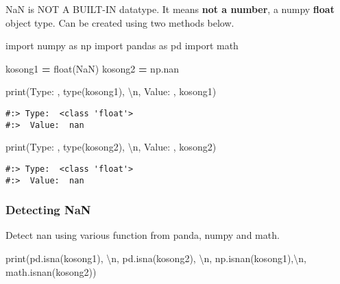 \documentclass[
]{book}
\newenvironment{Shaded}{\begin{snugshade}}{\end{snugshade}}
\newcommand{\BuiltInTok}[1]{#1}
\newcommand{\CharTok}[1]{\textcolor[rgb]{0.5,0.5,0.5}{#1}}
\newcommand{\ImportTok}[1]{#1}
\newcommand{\NormalTok}[1]{#1}
\newcommand{\OperatorTok}[1]{\textcolor[rgb]{0.43,0.43,0.43}{\textbf{#1}}}
\newcommand{\StringTok}[1]{\textcolor[rgb]{0.5,0.5,0.5}{#1}}
\begin{document}
NaN is NOT A BUILT-IN datatype. It means \textbf{not a number}, a numpy \textbf{float} object type. Can be created using two methods below.

\begin{Shaded}
\begin{Highlighting}[]
\ImportTok{import}\NormalTok{ numpy }\ImportTok{as}\NormalTok{ np}
\ImportTok{import}\NormalTok{ pandas }\ImportTok{as}\NormalTok{ pd}
\ImportTok{import}\NormalTok{ math}

\NormalTok{kosong1 }\OperatorTok{=} \BuiltInTok{float}\NormalTok{(}\StringTok{\textquotesingle{}NaN\textquotesingle{}}\NormalTok{)}
\NormalTok{kosong2 }\OperatorTok{=}\NormalTok{ np.nan}

\BuiltInTok{print}\NormalTok{(}\StringTok{\textquotesingle{}Type: \textquotesingle{}}\NormalTok{, }\BuiltInTok{type}\NormalTok{(kosong1), }\StringTok{\textquotesingle{}}\CharTok{\textbackslash{}n}\StringTok{\textquotesingle{}}\NormalTok{,}
       \StringTok{\textquotesingle{}Value: \textquotesingle{}}\NormalTok{, kosong1)}
\end{Highlighting}
\end{Shaded}

\begin{verbatim}
#:> Type:  <class 'float'> 
#:>  Value:  nan
\end{verbatim}

\begin{Shaded}
\begin{Highlighting}[]
\BuiltInTok{print}\NormalTok{(}\StringTok{\textquotesingle{}Type: \textquotesingle{}}\NormalTok{, }\BuiltInTok{type}\NormalTok{(kosong2), }\StringTok{\textquotesingle{}}\CharTok{\textbackslash{}n}\StringTok{\textquotesingle{}}\NormalTok{,}
       \StringTok{\textquotesingle{}Value: \textquotesingle{}}\NormalTok{, kosong2)}
\end{Highlighting}
\end{Shaded}

\begin{verbatim}
#:> Type:  <class 'float'> 
#:>  Value:  nan
\end{verbatim}

\hypertarget{detecting-nan}{%
\subsubsection{Detecting NaN}\label{detecting-nan}}

Detect nan using various function from panda, numpy and math.

\begin{Shaded}
\begin{Highlighting}[]
\BuiltInTok{print}\NormalTok{(pd.isna(kosong1), }\StringTok{\textquotesingle{}}\CharTok{\textbackslash{}n}\StringTok{\textquotesingle{}}\NormalTok{,}
\NormalTok{      pd.isna(kosong2), }\StringTok{\textquotesingle{}}\CharTok{\textbackslash{}n}\StringTok{\textquotesingle{}}\NormalTok{,}
\NormalTok{      np.isnan(kosong1),}\StringTok{\textquotesingle{}}\CharTok{\textbackslash{}n}\StringTok{\textquotesingle{}}\NormalTok{,}
\NormalTok{      math.isnan(kosong2))}
\end{Highlighting}
\end{Shaded}
\end{document}
